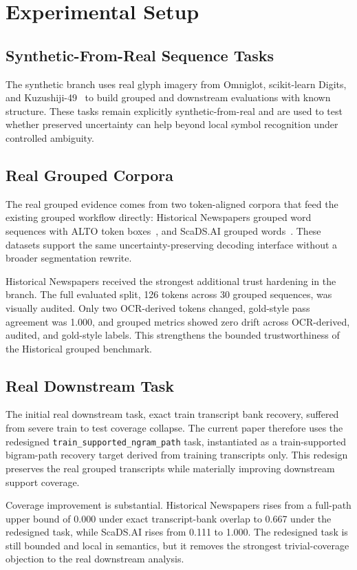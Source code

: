 \section{Experimental Setup}

\subsection{Synthetic-From-Real Sequence Tasks}

The synthetic branch uses real glyph imagery from Omniglot, scikit-learn Digits, and Kuzushiji-49~\cite{lake2015omniglot,pedregosa2011scikit,clanuwat2018kuzushiji} to build grouped and downstream evaluations with known structure. These tasks remain explicitly synthetic-from-real and are used to test whether preserved uncertainty can help beyond local symbol recognition under controlled ambiguity.

\subsection{Real Grouped Corpora}

The real grouped evidence comes from two token-aligned corpora that feed the existing grouped workflow directly: Historical Newspapers grouped word sequences with ALTO token boxes~\cite{historical_newspapers_gt}, and ScaDS.AI grouped words~\cite{scadsai_grouped_words}. These datasets support the same uncertainty-preserving decoding interface without a broader segmentation rewrite.

Historical Newspapers received the strongest additional trust hardening in the branch. The full evaluated split, 126 tokens across 30 grouped sequences, was visually audited. Only two OCR-derived tokens changed, gold-style pass agreement was 1.000, and grouped metrics showed zero drift across OCR-derived, audited, and gold-style labels. This strengthens the bounded trustworthiness of the Historical grouped benchmark.

\subsection{Real Downstream Task}

The initial real downstream task, exact train transcript bank recovery, suffered from severe train to test coverage collapse. The current paper therefore uses the redesigned \texttt{train\_supported\_ngram\_path} task, instantiated as a train-supported bigram-path recovery target derived from training transcripts only. This redesign preserves the real grouped transcripts while materially improving downstream support coverage.

Coverage improvement is substantial. Historical Newspapers rises from a full-path upper bound of 0.000 under exact transcript-bank overlap to 0.667 under the redesigned task, while ScaDS.AI rises from 0.111 to 1.000. The redesigned task is still bounded and local in semantics, but it removes the strongest trivial-coverage objection to the real downstream analysis.
